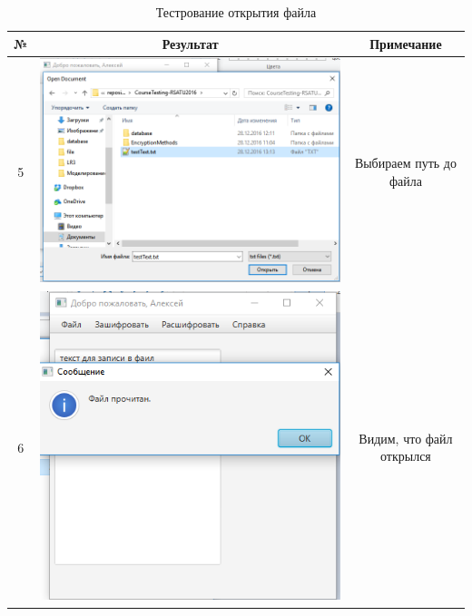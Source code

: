 \documentclass[a4paper,12pt]{article}
\begin{document}
\begin{table}[pt!]
	\caption{Тестрование открытия файла}
	\centering
	\begin{tabular}{|c|c|c|}
	\hline 
	№  & Результат & Примечание \\ 
	\hline 
	5 & \includegraphics[scale=0.3]{img/file/open/text_open2.png} & Выбираем путь до файла\\
	\hline 
	6 & \includegraphics[scale=0.3]{img/file/open/text_open3.png} & Видим, что файл открылся\\
	\hline

\end{tabular}
\end{table}
\end{document}
